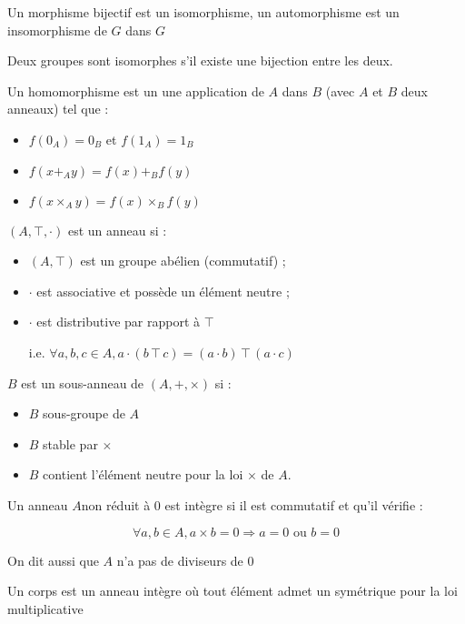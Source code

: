 \documentclass[a4paper,12pt]{book}
\newcommand{\Def}[2]{\begin{tcolorbox}[colback=white,colframe=red!10!green!20!blue!75!, title=Définition : #1]#2\end{tcolorbox}}
\begin{document}
\Def{}{Un morphisme bijectif est un isomorphisme, un automorphisme est un insomorphisme de $G$ dans $G$
\par Deux groupes sont isomorphes s'il existe une bijection entre les deux.
\par Un homomorphisme est un une application de $A$ dans $B$ (avec $A$ et $B$ deux anneaux) tel que :\begin{itemize}
\item $f(0_A) = 0_B$ et $f(1_A) = 1_B$
\item $f(x+_Ay) = f(x)+_B f(y)$
\item $f(x\times_A y) = f(x)\times_B f(y)$
\end{itemize}}

\Def{Anneau}{$(A,\intercal, \cdot)$ est un anneau si :\begin{itemize}
\item $(A, \intercal)$ est un groupe abélien (commutatif) ;
\item $\cdot$ est associative et possède un élément neutre ;
\item $\cdot$ est distributive par rapport à $\intercal$
\par i.e. $\forall a,b,c\in A, a\cdot (b\intercal c) = (a\cdot b)\intercal (a\cdot c)$
\end{itemize}}
\Def{Sous-anneau}{$B$ est un sous-anneau de $(A,+,\times)$ si :\begin{itemize}
\item $B$ sous-groupe de $A$
\item $B$ stable par $\times$
\item $B$ contient l'élément neutre pour la loi $\times$ de $A$.
\end{itemize}}
\Def{Intégrité}{Un anneau $A$non réduit à $0$ est intègre si il est commutatif et qu'il vérifie :
\par $$\forall a,b\in A, a\times b = 0\Rightarrow a = 0\text{ ou } b=0$$
\par On dit aussi que $A$ n'a pas de diviseurs de $0$}
\Def{Corps}{Un corps est un anneau intègre où tout élément admet un symétrique pour la loi multiplicative}
\end{document}
